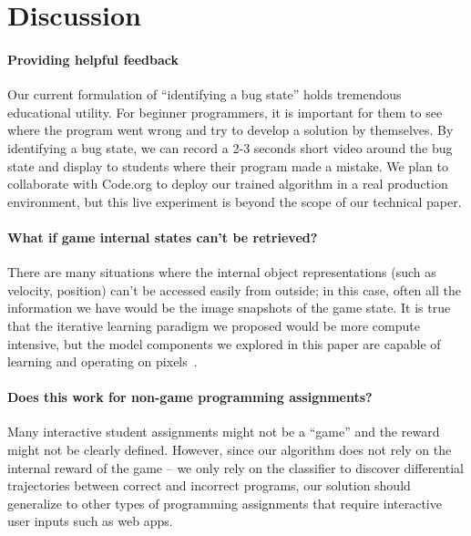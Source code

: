 \documentclass{article}
\newcommand{\EDIT}[1]{#1}%
\begin{document}
\section{Discussion}
\vspace{-2mm}





\EDIT{\paragraph{Providing helpful feedback}  Our current formulation of ``identifying a bug state'' holds tremendous educational utility. For beginner programmers, it is important for them to see where the program went wrong and try to develop a solution by themselves. By identifying a bug state, we can record a 2-3 seconds short video around the bug state and display to students where their program made a mistake. We plan to collaborate with Code.org to deploy our trained algorithm in a real production environment, but this live experiment is beyond the scope of our technical paper.}

\paragraph{What if game internal states can't be \EDIT{retrieved}?} There are many situations where the internal object representations (such as velocity, position) can't be accessed easily from outside; in this case, often all the information we have would be the image snapshots of the game state. It is true that the iterative learning paradigm we proposed would be more compute intensive, but the model components we explored in this paper are capable of learning and operating on pixels~\cite{van2016pixel}. 

\paragraph{Does this work for non-game programming assignments?} Many \EDIT{interactive} student assignments might not be a ``game'' and the reward might not be clearly defined. However, since our algorithm does not rely on the internal reward of the game -- we only rely on the classifier to discover  differential trajectories between correct and incorrect programs, our solution should generalize to other types of programming assignments that require interactive user inputs \EDIT{such as web apps}.
\end{document}
